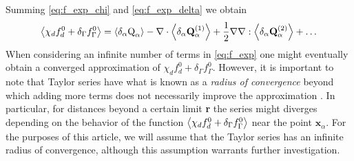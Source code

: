 Summing \ref{eq:f_exp_chi} and \ref{eq:f_exp_delta} we obtain
\begin{equation}
    \avg{\chi_df_d^0+\delta_\Gamma  f_\Gamma ^0} = \pavg{\text Q_\alpha}
    - \div  
    \pavg{\textbf{Q}_\alpha^{(1)}}        
    + \frac{1}{2} \grad\grad : \pavg{\textbf{Q}_{\alpha}^{(2)}}
    + \ldots  \label{eq:f_exp}
\end{equation}
When considering an infinite number of terms in \ref{eq:f_exp} one might eventually obtain a converged approximation of $\chi_d f_d^0+\delta_\Gamma  f_\Gamma ^0$. 
However, it is important to note that Taylor series have what is known as a \textit{radius of convergence} beyond which adding more terms does not necessarily improve the approximation \citep[Chapter 1]{appel2007}. 
In particular, for distances beyond a certain limit \textbf{r} the series might diverges depending on the behavior of the function $\left<\chi_d f_d^0+\delta_\Gamma  f_\Gamma ^0\right>$ near the point $\textbf{x}_\alpha$. 
For the purposes of this article, we will assume that the Taylor series has an infinite radius of convergence, although this assumption warrants further investigation.%



